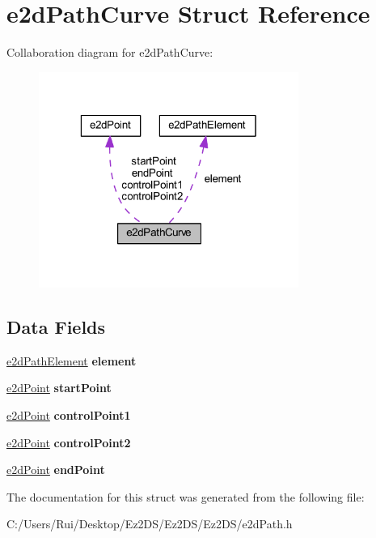 \hypertarget{structe2d_path_curve}{\section{e2d\-Path\-Curve Struct Reference}
\label{structe2d_path_curve}
}


Collaboration diagram for e2d\-Path\-Curve\-:\nopagebreak
\begin{figure}[H]
\begin{center}
\leavevmode
\includegraphics[width=241pt]{structe2d_path_curve__coll__graph}
\end{center}
\end{figure}
\subsection*{Data Fields}
\begin{DoxyCompactItemize}
\item 
\hypertarget{structe2d_path_curve_a88e514266530010a1a3b08198b3cc763}{\hyperlink{structe2d_path_element}{e2d\-Path\-Element} {\bfseries element}}\label{structe2d_path_curve_a88e514266530010a1a3b08198b3cc763}

\item 
\hypertarget{structe2d_path_curve_a96868a222a14861eb6e64214328c6159}{\hyperlink{structe2d_point}{e2d\-Point} {\bfseries start\-Point}}\label{structe2d_path_curve_a96868a222a14861eb6e64214328c6159}

\item 
\hypertarget{structe2d_path_curve_a5fe58a06185a33704c2cc77c8a58fb0d}{\hyperlink{structe2d_point}{e2d\-Point} {\bfseries control\-Point1}}\label{structe2d_path_curve_a5fe58a06185a33704c2cc77c8a58fb0d}

\item 
\hypertarget{structe2d_path_curve_a929324aa1e3527d71e312e5f80cb24db}{\hyperlink{structe2d_point}{e2d\-Point} {\bfseries control\-Point2}}\label{structe2d_path_curve_a929324aa1e3527d71e312e5f80cb24db}

\item 
\hypertarget{structe2d_path_curve_a0ae59a21d141722d36c0ebc740587f9d}{\hyperlink{structe2d_point}{e2d\-Point} {\bfseries end\-Point}}\label{structe2d_path_curve_a0ae59a21d141722d36c0ebc740587f9d}

\end{DoxyCompactItemize}


The documentation for this struct was generated from the following file\-:\begin{DoxyCompactItemize}
\item 
C\-:/\-Users/\-Rui/\-Desktop/\-Ez2\-D\-S/\-Ez2\-D\-S/\-Ez2\-D\-S/e2d\-Path.\-h\end{DoxyCompactItemize}
